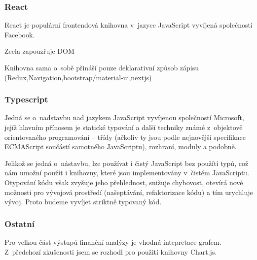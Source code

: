 \subsubsection{React}
React je populární frontendová knihovna v~jazyce JavaScript vyvíjená společností Facebook. 

Zcela zapouzřuje DOM

Knihovna sama o~sobě přináší pouze deklarativní způsob zápisu 
(Redux,Navigation,bootstrap/material-ui,nextjs)


\subsubsection{Typescript}
Jedná se o~nadstavbu nad jazykem JavaScript vyvíjenou společností Microsoft, jejíž hlavním přínosem je statické typování a další techniky známé z~objektově orientovaného programování -- třídy (ačkoliv ty jsou podle nejnovější specifikace ECMAScript součástí samotného JavaScriptu), rozhraní, moduly a podobně.

Jelikož se jedná o~nástavbu, lze používat i čistý JavaScript bez použítí typů, což nám umožní použít i knihovny, které jsou implementovány v~čistém JavaScriptu. Otypování kódu však zvyšuje jeho přehlednost, snižuje chybovost, otevírá nové možnosti pro vývojová prostředí (našeptávání, refaktorizace kódu) a tím urychluje vývoj. Proto budeme vyvíjet striktně typovaný kód. 


\subsubsection{Ostatní}
Pro velkou část výstupů finanční analýzy je vhodná intepretace grafem. Z~předchozí zkušenosti jsem se rozhodl pro použití knihovny Chart.js. 

